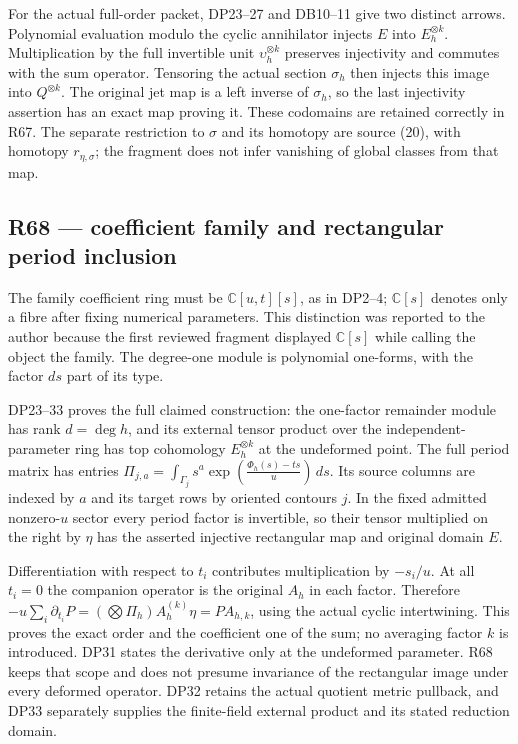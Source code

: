 For the actual full-order packet, DP23--27 and DB10--11 give two
distinct arrows. Polynomial evaluation modulo the cyclic annihilator
injects \(E\) into \(E_h^{\otimes k}\). Multiplication by the full
invertible unit \(\upsilon_h^{\otimes k}\) preserves injectivity and
commutes with the sum operator. Tensoring the actual section
\(\sigma_h\) then injects this image into \(Q^{\otimes k}\). The
original jet map is a left inverse of \(\sigma_h\), so the last
injectivity assertion has an exact map proving it. These codomains are
retained correctly in R67. The separate restriction to \(\sigma\) and
its homotopy are source (20), with homotopy \(r_{\eta,\sigma}\); the
fragment does not infer vanishing of global classes from that map.

\subsection{R68 --- coefficient family and rectangular period
inclusion}\label{r68-coefficient-family-and-rectangular-period-inclusion}

The family coefficient ring must be \(\mathbb C[u,t][s]\), as in DP2--4;
\(\mathbb C[s]\) denotes only a fibre after fixing numerical parameters.
This distinction was reported to the author because the first reviewed
fragment displayed \(\mathbb C[s]\) while calling the object the family.
The degree-one module is polynomial one-forms, with the factor \(ds\)
part of its type.

DP23--33 proves the full claimed construction: the one-factor remainder
module has rank \(d=\deg h\), and its external tensor product over the
independent-parameter ring has top cohomology \(E_h^{\otimes k}\) at the
undeformed point. The full period matrix has entries
\(\Pi_{j,a}=\int_{\Gamma_j}s^a\exp\!\left(\frac{\Phi_h(s)-ts}{u}\right)\,ds\).
Its source columns are indexed by \(a\) and its target rows by oriented
contours \(j\). In the fixed admitted nonzero-\(u\) sector every period
factor is invertible, so their tensor multiplied on the right by
\(\eta\) has the asserted injective rectangular map and original domain
\(E\).

Differentiation with respect to \(t_i\) contributes multiplication by
\(-s_i/u\). At all \(t_i=0\) the companion operator is the original
\(A_h\) in each factor. Therefore
\(-u\sum_i\partial_{t_i}P=(\bigotimes\Pi_h)A_h^{(k)}\eta=P A_{h,k}\),
using the actual cyclic intertwining. This proves the exact order and
the coefficient one of the sum; no averaging factor \(k\) is introduced.
DP31 states the derivative only at the undeformed parameter. R68 keeps
that scope and does not presume invariance of the rectangular image
under every deformed operator. DP32 retains the actual quotient metric
pullback, and DP33 separately supplies the finite-field external product
and its stated reduction domain.

